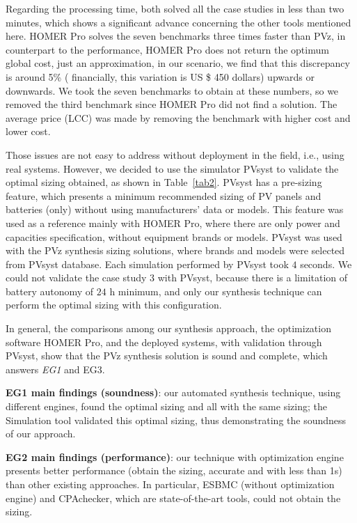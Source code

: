 \documentclass[a4paper,donotrepeattitle,fleqn]{cas-dc}
\begin{document}
Regarding the processing time, both solved all the case studies in less than two minutes, which shows a significant advance concerning the other tools mentioned here. HOMER Pro solves the seven benchmarks three times faster than PVz, in counterpart to the performance, HOMER Pro does not return the optimum global cost, just an approximation, in our scenario, we find that this discrepancy is around 5\% ( financially, this variation is US \$ 450 dollars) upwards or downwards. We took the seven benchmarks to obtain at these numbers, so we removed the third benchmark since HOMER Pro did not find a solution. The average price (LCC) was made by removing the benchmark with higher cost and lower cost.

Those issues are not easy to address without deployment in the field, i.e., using real systems. However, we decided to use the simulator PVsyst to validate the optimal sizing obtained, as shown in Table~\ref{tab2}. PVsyst has a pre-sizing feature, which presents a minimum recommended sizing of PV panels and batteries (only) without using manufacturers' data or models. This feature was used as a reference mainly with HOMER Pro, where there are only power and capacities specification, without equipment brands or models. PVsyst was used with the PVz synthesis sizing solutions, where brands and models were selected from PVsyst database. Each simulation performed by PVsyst took $4$ seconds. We could not validate the case study $3$ with PVsyst, because there is a limitation of battery autonomy of $24$ h minimum, and only our synthesis technique can perform the optimal sizing with this configuration.

In general, the comparisons among our synthesis approach, the optimization software HOMER Pro, and the deployed systems, with validation through PVsyst, show that the PVz synthesis solution is sound and complete, which answers \textit{EG1} and {EG3}.

\begin{tcolorbox}
\textbf{EG1 main findings (soundness)}: our automated synthesis technique, using different engines, found the optimal sizing and all with the same sizing; the Simulation tool validated this optimal sizing, thus demonstrating the soundness of our approach.
\end{tcolorbox}

\begin{tcolorbox}
\textbf{EG2 main findings (performance)}: our technique with optimization engine presents better performance (obtain the sizing, accurate and with less than 1s) than other existing approaches. In particular, ESBMC (without optimization engine) and CPAchecker, which are state-of-the-art tools, could not obtain the sizing.
\end{tcolorbox}
\end{document}
